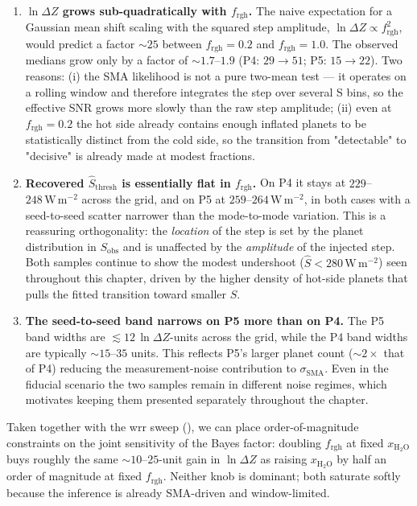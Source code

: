 \begin{enumerate}
    \item \textbf{$\ln\Delta Z$ grows sub-quadratically with
    $f_\mathrm{rgh}$.}  The naive expectation for a Gaussian mean shift
    scaling with the squared step amplitude,
    $\ln\Delta Z \propto f_\mathrm{rgh}^2$, would predict a factor
    ${\sim}25$ between $f_\mathrm{rgh}=0.2$ and $f_\mathrm{rgh}=1.0$.
    The observed medians grow only by a factor of ${\sim}1.7$--$1.9$
    (P4: $29\to 51$; P5: $15\to 22$).  Two reasons: (i) the SMA
    likelihood is not a pure two-mean test --- it operates on a
    rolling window and therefore integrates the step over several
    S bins, so the effective SNR grows more slowly than the raw step
    amplitude; (ii) even at $f_\mathrm{rgh}=0.2$ the hot side already
    contains enough inflated planets to be statistically distinct from
    the cold side, so the transition from "detectable" to "decisive"
    is already made at modest fractions.
    \item \textbf{Recovered $\hat{S}_\mathrm{thresh}$ is essentially
    flat in $f_\mathrm{rgh}$.}  On P4 it stays at
    $229$--$248\,\mathrm{W\,m^{-2}}$ across the grid, and on P5 at
    $259$--$264\,\mathrm{W\,m^{-2}}$, in both cases with a seed-to-seed
    scatter narrower than the mode-to-mode variation.  This is a
    reassuring orthogonality: the \emph{location} of the step is set by
    the planet distribution in $S_\mathrm{obs}$ and is unaffected by
    the \emph{amplitude} of the injected step.  Both samples continue
    to show the modest undershoot ($\hat{S} < 280\,\mathrm{W\,m^{-2}}$)
    seen throughout this chapter, driven by the higher density of hot-side
    planets that pulls the fitted transition toward smaller $S$.
    \item \textbf{The seed-to-seed band narrows on P5 more than on
    P4.}  The P5 band widths are $\lesssim 12\,\ln\Delta Z$-units
    across the grid, while the P4 band widths are typically
    $\sim 15$--$35$ units.  This reflects P5's larger planet count
    (${\sim}\!2\times$ that of P4) reducing the measurement-noise
    contribution to $\sigma_\mathrm{SMA}$.  Even in the fiducial
    scenario the two samples remain in different noise regimes,
    which motivates keeping them presented separately throughout the
    chapter.
\end{enumerate}

Taken together with the wrr sweep (), we can
place order-of-magnitude constraints on the joint sensitivity of the
Bayes factor: doubling $f_\mathrm{rgh}$ at fixed $x_{\mathrm{H_2O}}$
buys roughly the same ${\sim}\!10$--$25$-unit gain in $\ln\Delta Z$
as raising $x_{\mathrm{H_2O}}$ by half an order of magnitude at fixed
$f_\mathrm{rgh}$.  Neither knob is dominant; both saturate softly
because the inference is already SMA-driven and window-limited.

